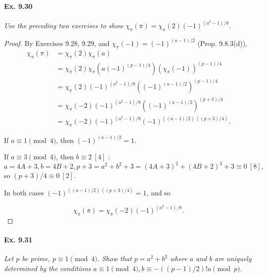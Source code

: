 \documentclass[11pt,a4paper]{article}
\begin{document}
\paragraph{Ex. 9.30}

{\it Use the preceding two exercises to show $\chi_\pi(\overline{\pi}) = \chi_\pi(2) (-1)^{(a^2-1)/8}$.
}

\begin{proof}
By Exercises 9.28, 9.29, and $\chi_\pi(-1) =(-1)^{(a-1)/2}$ (Prop. 9.8.3(d)),
\begin{align*}
\chi_{\pi}(\overline{\pi})&=  \chi_\pi(2) \chi_\pi(a)\\
&=\chi_\pi(2) \chi_\pi(a(-1)^{(p-1)/4})(\chi_\pi(-1))^{(p-1)/4}\\
&=\chi_\pi(2) (-1)^{(a^2-1)/8} ((-1)^{(a-1)/2})^{(p-1)/4}\\
&=\chi_\pi (-2)(-1)^{(a^2-1)/8} ((-1)^{(a-1)/2})^{(p+3)/4}\\
&=\chi_\pi(-2) (-1)^{(a^2-1)/8}  (-1)^{((a-1)/2)\,((p+3)/4)}.
\end{align*}

If $a \equiv 1 \pmod 4$, then $(-1)^{(a-1)/2}=1$.

If $a \equiv 3 \pmod 4$, then $b \equiv 2 \ [4]$ : $$a=4A+3,b=4B+2,p+3 = a^2+b^2+3 = (4A+3)^2+(4B+2)^2+3 \equiv 0 \ [8],$$ so $(p+3)/4 \equiv 0 \ [2].$

In both cases  $  (-1)^{((a-1)/2)\,((p+3)/4)}=1$, and so

$$\chi_{\pi}(\overline{\pi})=\chi_\pi(-2) (-1)^{(a^2-1)/8}.  $$
\end{proof}

\paragraph{Ex. 9.31}

{\it Let $p$ be prime, $p\equiv 1 \pmod 4$. Show that $p = a^2+b^2$ where $a$ and $b$ are uniquely determined by the conditions $a \equiv 1 \pmod 4, b \equiv -((p-1)/2)! a \pmod p$.
}
\end{document}
